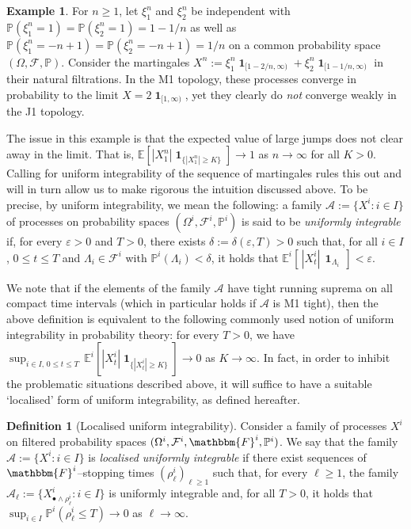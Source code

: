\documentclass[11pt]{article}
\theoremstyle{definition}\newtheorem{example}[theorem]{Example}
\theoremstyle{definition}\newtheorem{counterexample}[theorem]{Counterexample}
\theoremstyle{definition}\newtheorem{remark}[theorem]{Remark}
\theoremstyle{definition}\newtheorem{defi}[theorem]{Definition}
\numberwithin{equation}{section}
\newcommand{\E}{\mathbb{E}}											%
\newcommand{\Pro}{\mathbb{P}}										%
\newcommand{\ind}{\operatorname{\mathbf{1}}}							%
\renewcommand{\|}{\; : \, \;}											%
\begin{document}
\begin{example} For $n\geq 1$, let $\xi^n_1$ and $\xi^n_2$ be independent with  $\Pro(\xi^n_1=1)=\Pro(\xi^n_2=1)=1-1/n$ as well as $\Pro(\xi^n_1=-n+1)=\Pro(\xi^n_2=-n+1)=1/n$ on a common probability space $(\Omega , \mathcal{F},\mathbb{P})$. Consider the martingales $X^n:= \xi^n_1 \ind_{[1-2/n,\infty)}+\xi^n_2\ind_{[1-1/n,\infty)}$ in their natural filtrations. In the M1 topology, these processes converge in probability to the limit $X= 2 \ind_{[1,\infty)}$, yet they clearly do \emph{not} converge weakly in the J1 topology.
\end{example}

The issue in this example is that the expected value of large jumps does not clear away in the limit. That is, $\E[|X^n_1|\ind_{\{|X^n_1|\ge K\}}] \to 1$ as $n\to \infty$ for all $K>0$. Calling for uniform integrability of the sequence of martingales rules this out and will in turn allow us to make rigorous the intuition discussed above. To be precise, by uniform integrability, we mean the following: a family $\mathcal{A}:=\{X^i :  i \in I\}$ of processes on probability spaces $(\Omega^i, \mathcal{F}^i, \Pro^i)$ is said to be \emph{uniformly integrable} if, for every $\varepsilon>0$ and $T>0$, there exists $\delta:=\delta(\varepsilon, T)>0$ such that, for all $i\in I$, $0\le t \le T$ and $\Lambda_i \in \mathcal{F}^i$ with $\Pro^i(\Lambda_i)< \delta$, it holds that $\E^i[\, |X^i_t| \, \ind_{\Lambda_i}\, ] < \varepsilon$.

We note that if the elements of the family $\mathcal{A}$ have tight running suprema on all compact time intervals (which in particular holds if $\mathcal{A}$ is M1 tight), then the above definition is equivalent to the following commonly used notion of uniform integrability in probability theory: for every $T>0$, we have $\operatorname{sup}_{i \in I,\, 0\le t \le T} \, \E^i[ |X^i_t| \ind_{\{|X^i_t|\ge K\}}] \to 0$ as $K \to \infty$. In fact, in order to inhibit the problematic situations described above, it will suffice to have a suitable `localised' form of uniform integrability, as defined hereafter.

\begin{defi}[Localised uniform integrability]\label{defn:local_UI} Consider a family of processes $X^i$ on filtered probability spaces $(\Omega^i, \mathcal{F}^i, \mathbbm{F}^i, \Pro^i)$. We say that the family $\mathcal{A}:=\{X^i :  i \in I\}$ is  \emph{localised uniformly integrable} if there exist sequences of $\mathbbm{F}^i$--stopping times $(\rho^i_\ell)_{\ell\ge 1}$ such that, for every $\ell\ge 1$, the family $\mathcal{A}_{\ell}:=\{X^i_{\bullet \wedge \rho^i_\ell} :  i \in I\}$ is uniformly integrable and, for all $T>0$, it holds that $\operatorname{sup}_{i\in I} \Pro^i(\rho^i_\ell \le T) \to 0$ as $\ell\to \infty$.
\end{defi} 
\end{document}
